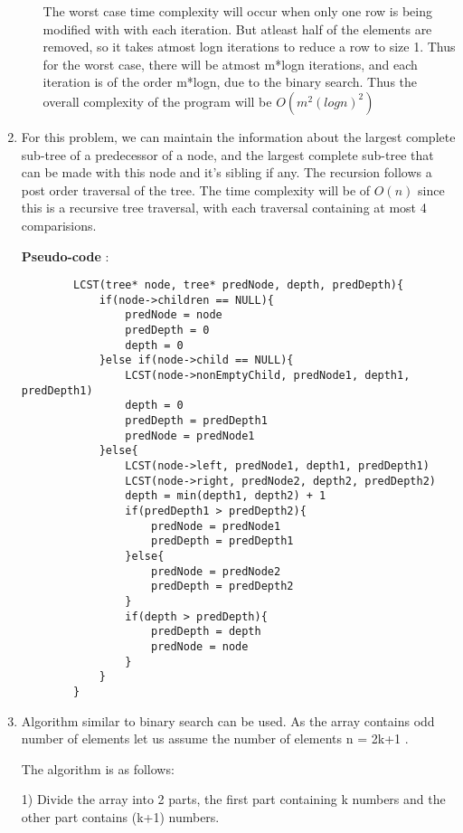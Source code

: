 \documentclass[12pt]{article}
\begin{document}
\begin{enumerate}
\begin{enumerate}
        The worst case time complexity will occur when only one row is being modified with with each iteration. But atleast half of the elements are removed, so it takes atmost logn iterations to reduce a row to size 1. Thus for the worst case, there will be atmost m*logn iterations, and each iteration is of the order m*logn, due to the binary search. Thus the overall complexity of the program will be $O(m^2(logn)^2)$ 
    \end{enumerate}
    \item %
    For this problem, we can maintain the information about the largest complete sub-tree of a predecessor of a node, and the largest complete sub-tree that can be made with this node and it's sibling if any. The recursion follows a post order traversal of the tree. The time complexity will be of $O(n)$ since this is a recursive tree traversal, with each traversal containing at most 4 comparisions. 
    
    
    \textbf{Pseudo-code} :
    \begin{verbatim}
        LCST(tree* node, tree* predNode, depth, predDepth){
            if(node->children == NULL){
                predNode = node
                predDepth = 0
                depth = 0
            }else if(node->child == NULL){
                LCST(node->nonEmptyChild, predNode1, depth1, predDepth1)
                depth = 0
                predDepth = predDepth1
                predNode = predNode1
            }else{
                LCST(node->left, predNode1, depth1, predDepth1)
                LCST(node->right, predNode2, depth2, predDepth2)
                depth = min(depth1, depth2) + 1
                if(predDepth1 > predDepth2){
                    predNode = predNode1
                    predDepth = predDepth1
                }else{
                    predNode = predNode2
                    predDepth = predDepth2
                }
                if(depth > predDepth){
                    predDepth = depth
                    predNode = node
                }
            }
        } 
    \end{verbatim}
    \item
    Algorithm similar to binary search can be used. As the array contains odd number of elements let us assume the number of elements n = 2k+1 . 
    
    The algorithm is as follows:
    
    1) Divide the array into 2 parts, the first part containing k numbers and the other part contains (k+1) numbers.
    

\end{enumerate}
\end{document}
